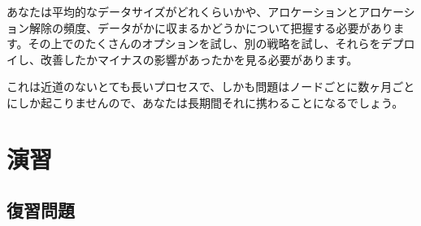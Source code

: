 あなたは平均的なデータサイズがどれくらいかや、アロケーションとアロケーション解除の頻度、データがかに収まるかどうかについて把握する必要があります。その上でのたくさんのオプションを試し、別の戦略を試し、それらをデプロイし、改善したかマイナスの影響があったかを見る必要があります。

これは近道のないとても長いプロセスで、しかも問題はノードごとに数ヶ月ごとにしか起こりませんので、あなたは長期間それに携わることになるでしょう。


\section{演習}

\subsection*{復習問題}

